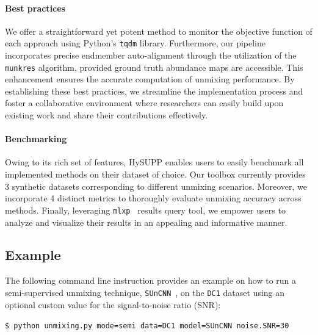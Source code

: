 \paragraph{Best practices}

We offer a straightforward yet potent method to monitor the objective function of each approach using Python's \texttt{tqdm} library. 
Furthermore, our pipeline incorporates precise endmember auto-alignment through the utilization of the \texttt{munkres} algorithm, provided ground truth abundance maps are accessible. 
This enhancement ensures the accurate computation of unmixing performance. 
By establishing these best practices, we streamline the implementation process and foster a collaborative environment where researchers can easily build upon existing work and share their contributions effectively.



\paragraph{Benchmarking}

Owing to its rich set of features, HySUPP enables users to easily benchmark all implemented methods on their dataset of choice. 
Our toolbox currently provides 3 synthetic datasets corresponding to different unmixing scenarios.
Moreover, we incorporate 4 distinct metrics to thoroughly evaluate unmixing accuracy across methods.
Finally, leveraging \texttt{mlxp}~\cite{arbel_mlxp_2023} results query tool, we empower users to analyze and visualize their results in an appealing and informative manner.

\subsection{Example}

The following command line instruction provides an example on how to run a semi-supervised unmixing technique, \texttt{SUnCNN}~\cite{rasti_suncnn_2022}, on the \texttt{DC1} dataset using an optional custom value for the signal-to-noise ratio (SNR):

\texttt{\$ python unmixing.py mode=semi data=DC1 model=SUnCNN noise.SNR=30}

